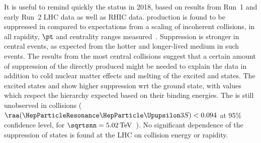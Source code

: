 \documentclass[../report.tex]{subfiles}
\begin{document}
It is useful to remind quickly the status in 2018, based on results from Run~1 and early Run~2 LHC data as well as RHIC data. \PGU production is found to be suppressed in \PbPb compared to expectations from a scaling of incoherent \pp collisions, in all rapidity, $\pt$ and centrality ranges measured~\cite{Abelev:2014nua,Acharya:2018mni,Sirunyan:2018nsz,Khachatryan:2016xxp}. Suppression is stronger in central events, as expected from the hotter and longer-lived medium in such events.
The results from the most central collisions suggest that a certain amount of suppression of the directly produced  might be needed
  to explain the data in addition to cold nuclear matter effects and melting of the excited \PGU and \PGcb states.
The excited states  and  show higher suppression wrt the ground state, with \raa values which respect
  the hierarchy expected based on their binding energies. The  is still unobserved in \PbPb collisions ($\raa(\PGUP{3S})<0.094$ at 95\% confidence
level, for $\sqrtsnn = \unit[5.02]{TeV}$~\cite{Sirunyan:2017lzi,Sirunyan:2018nsz}). 
No significant dependence of the suppression of \PGU states is found at the LHC on collision energy or rapidity.
\end{document}
